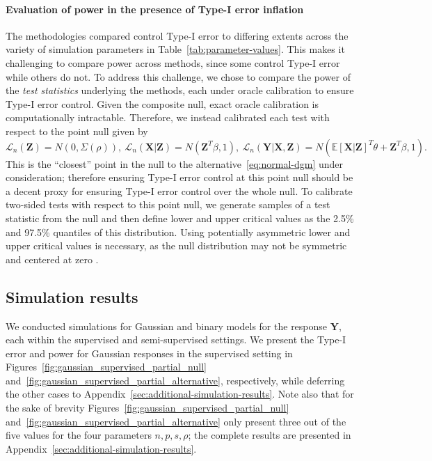 \documentclass[aos]{imsart}
\theoremstyle{plain}
\theoremstyle{remark}
\newcommand{\E}{\mathbb E}								%
\newcommand{\prx}{\bm X}								%
\newcommand{\prz}{\bm Z}								%
\newcommand{\pry}{{\bm Y}}								%
\newcommand{\law}{\mathcal L}							%
\begin{document}
\paragraph*{Evaluation of power in the presence of Type-I error inflation}

The methodologies compared control Type-I error to differing extents across the variety of simulation parameters in Table~\ref{tab:parameter-values}. This makes it challenging to compare power across methods, since some control Type-I error while others do not. To address this challenge, we chose to compare the power of the \textit{test statistics} underlying the methods, each under oracle calibration to ensure Type-I error control. Given the composite null, exact oracle calibration is computationally intractable. Therefore, we instead calibrated each test with respect to the point null given by 
\begin{equation*}
    \law_n(\prz) = N(0, \Sigma(\rho)),\ \law_n(\prx | \prz) = N(\prz^T \beta, 1), \ \law_n(\pry|\prx,\prz) = N(\E[\prx|\prz]^T \theta + \prz^T \beta, 1).
\end{equation*}
This is the ``closest'' point in the null to the alternative~\eqref{eq:normal-dgm} under consideration; therefore ensuring Type-I error control at this point null should be a decent proxy for ensuring Type-I error control over the whole null. To calibrate two-sided tests with respect to this point null, we generate samples of a test statistic from the null and then define lower and upper critical values as the 2.5\% and 97.5\% quantiles of this distribution. Using potentially asymmetric lower and upper critical values is necessary, as the null distribution may not be symmetric and centered at zero \citep{Liu2022a}.

\subsection{Simulation results} \label{sec:sim-results}

We conducted simulations for Gaussian and binary models for the response $\pry$, each within the supervised and semi-supervised settings. We present the Type-I error and power for Gaussian responses in the supervised setting in Figures~\ref{fig:gaussian_supervised_partial_null} and~\ref{fig:gaussian_supervised_partial_alternative}, respectively, while deferring the other cases to Appendix~\ref{sec:additional-simulation-results}. Note also that for the sake of brevity Figures~\ref{fig:gaussian_supervised_partial_null} and~\ref{fig:gaussian_supervised_partial_alternative} only present three out of the five values for the four parameters $n, p, s, \rho$; the complete results are presented in Appendix~\ref{sec:additional-simulation-results}.
\end{document}
